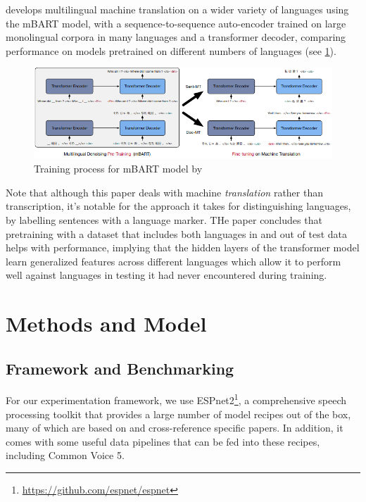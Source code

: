 \documentclass{article}
\begin{document}
  \cite{Liu} develops multilingual machine translation on a wider variety of languages using the mBART model, with a sequence-to-sequence auto-encoder trained on large monolingual corpora in many languages and a transformer decoder, comparing performance on models pretrained on different numbers of languages (see \ref{diagram liu}).
  \begin{figure}[H]
    \includegraphics[width=\textwidth]{images/diagram-liu}
    \caption{Training process for mBART model by \cite{Liu}}
    \label{diagram liu}
  \end{figure}
  Note that although this paper deals with machine \emph{translation} rather than transcription, it's notable for the approach it takes for distinguishing languages, by labelling sentences with a language marker. THe paper concludes that pretraining with a dataset that includes both languages in and out of test data helps with performance, implying that the hidden layers of the transformer model learn generalized features across different languages which allow it to perform well against languages in testing it had never encountered during training.
  \section{Methods and Model}
  \subsection{Framework and Benchmarking}
  For our experimentation framework, we use ESPnet2\footnote{\url{https://github.com/espnet/espnet}}, a comprehensive speech processing toolkit that provides a large number of model recipes out of the box, many of which are based on and cross-reference specific papers. In addition, it comes with some useful data pipelines that can be fed into these recipes, including Common Voice 5.
\end{document}
